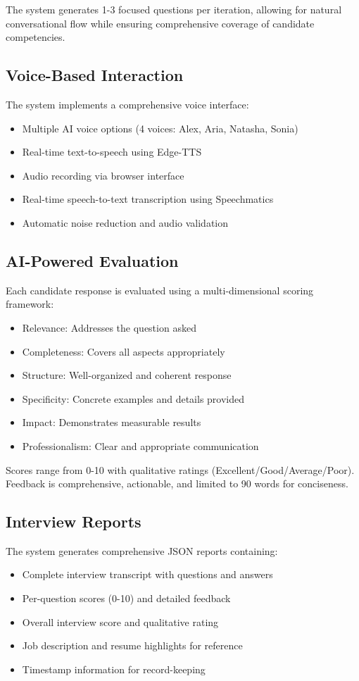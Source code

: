 \documentclass[conference]{IEEEtran}
\begin{document}
The system generates 1-3 focused questions per iteration, allowing for natural conversational flow while ensuring comprehensive coverage of candidate competencies.

\subsection{Voice-Based Interaction}
The system implements a comprehensive voice interface:
\begin{itemize}
\item Multiple AI voice options (4 voices: Alex, Aria, Natasha, Sonia)
\item Real-time text-to-speech using Edge-TTS
\item Audio recording via browser interface
\item Real-time speech-to-text transcription using Speechmatics
\item Automatic noise reduction and audio validation
\end{itemize}

\subsection{AI-Powered Evaluation}
Each candidate response is evaluated using a multi-dimensional scoring framework:
\begin{itemize}
\item Relevance: Addresses the question asked
\item Completeness: Covers all aspects appropriately
\item Structure: Well-organized and coherent response
\item Specificity: Concrete examples and details provided
\item Impact: Demonstrates measurable results
\item Professionalism: Clear and appropriate communication
\end{itemize}

Scores range from 0-10 with qualitative ratings (Excellent/Good/Average/Poor). Feedback is comprehensive, actionable, and limited to 90 words for conciseness.

\subsection{Interview Reports}
The system generates comprehensive JSON reports containing:
\begin{itemize}
\item Complete interview transcript with questions and answers
\item Per-question scores (0-10) and detailed feedback
\item Overall interview score and qualitative rating
\item Job description and resume highlights for reference
\item Timestamp information for record-keeping
\end{itemize}
\end{document}
